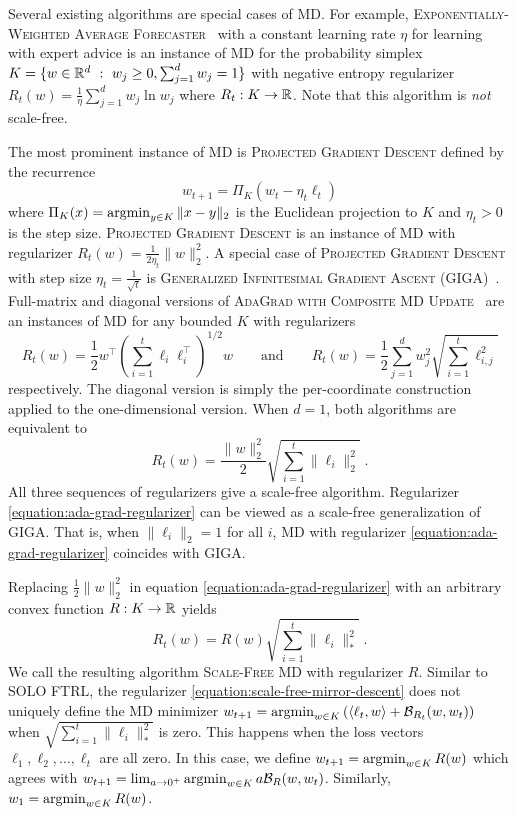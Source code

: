 Several existing algorithms are special cases of \textsc{MD}.
For example, \textsc{Exponentially-Weighted Average
Forecaster}~\cite[Chapter~2]{Cesa-Bianchi-Lugosi-2006} with a constant learning
rate $\eta$ for learning with expert advice is an instance of
\textsc{MD} for the probability simplex $K = \{ w \in \mathbb{R}^d ~:~ w_j
\ge 0, \sum_{j=1}^d w_j = 1 \}$ with negative entropy regularizer $R_t(w) =
\frac{1}{\eta} \sum_{j=1}^d w_j \ln w_j$ where $R_t:K \to \mathbb{R}$. Note that this
algorithm is \emph{not} scale-free.

The most prominent instance of \textsc{MD} is \textsc{Projected Gradient
Descent} defined by the recurrence
$$
w_{t+1} = \Pi_K(w_t - \eta_t \ell_t)
$$
where $\Pi_K(x) = \operatorname*{argmin}_{y \in K} \|x-y\|_2$ is the Euclidean projection to
$K$ and $\eta_t > 0$ is the step size.  \textsc{Projected Gradient Descent} is
an instance of \textsc{MD} with regularizer $R_t(w) =
\frac{1}{2\eta_t}\|w\|_2^2$.  A special case of \textsc{Projected Gradient
Descent} with step size $\eta_t = \frac{1}{\sqrt{t}}$ is \textsc{Generalized
Infinitesimal Gradient Ascent} (GIGA)~\cite{Zinkevich-2003}.  Full-matrix and
diagonal versions of \textsc{AdaGrad with Composite MD
Update}~\cite{Duchi-Hazan-Singer-2011} are an instances of \textsc{MD} for any
bounded $K$ with regularizers
$$
R_t(w) = \frac{1}{2} w^\top \left(\sum_{i=1}^t \ell_i \ell_i^\top \right)^{1/2} \!\!\!\! w
\qquad \text{and} \qquad
R_t(w) = \frac{1}{2} \sum_{j=1}^d w_j^2 \sqrt{ \sum_{i=1}^t \ell_{i,j}^2}
$$
respectively. The diagonal version is simply the per-coordinate construction
applied to the one-dimensional version. When $d=1$, both algorithms are
equivalent to
\begin{equation}
\label{equation:ada-grad-regularizer}
R_t(w) = \frac{\|w\|_2^2}{2} \sqrt{\sum_{i=1}^t \|\ell_i\|_2^2 } \; .
\end{equation}
All three sequences of regularizers give a scale-free algorithm. Regularizer
\eqref{equation:ada-grad-regularizer} can be viewed as a scale-free
generalization of GIGA. That is, when $\|\ell_i\|_2
= 1$ for all $i$, \textsc{MD} with regularizer
\eqref{equation:ada-grad-regularizer} coincides with GIGA.

Replacing $\frac{1}{2}\|w\|_2^2$ in equation
\eqref{equation:ada-grad-regularizer} with an arbitrary convex function $R:K
\to \mathbb{R}$ yields
\begin{equation}
\label{equation:scale-free-mirror-descent}
R_t(w) = R(w) \sqrt{\sum_{i=1}^t \|\ell_i\|_*^2} \; .
\end{equation}
We call the resulting algorithm \textsc{Scale-Free MD} with
regularizer $R$. Similar to \textsc{SOLO FTRL}, the regularizer
\eqref{equation:scale-free-mirror-descent} does not uniquely define
the \textsc{MD} minimizer
$w_{t+1} = \operatorname*{argmin}_{w \in K} \left(\langle \ell_t, w \rangle + \mathcal{B}_{R_t}(w,
w_t) \right)$ when $\sqrt{\sum_{i=1}^t \|\ell_i\|_*^2}$ is zero.
This happens when the loss vectors $\ell_1, \ell_2, \dots, \ell_t$ are all
zero. In this case, we define
$w_{t+1} = \operatorname*{argmin}_{w \in K} R(w)$ which agrees with
$w_{t+1} = \lim_{a \to 0^+} \operatorname*{argmin}_{w \in K} a \mathcal{B}_{R}(w, w_t)$.
Similarly, $w_1 = \operatorname*{argmin}_{w \in K} R(w)$.

